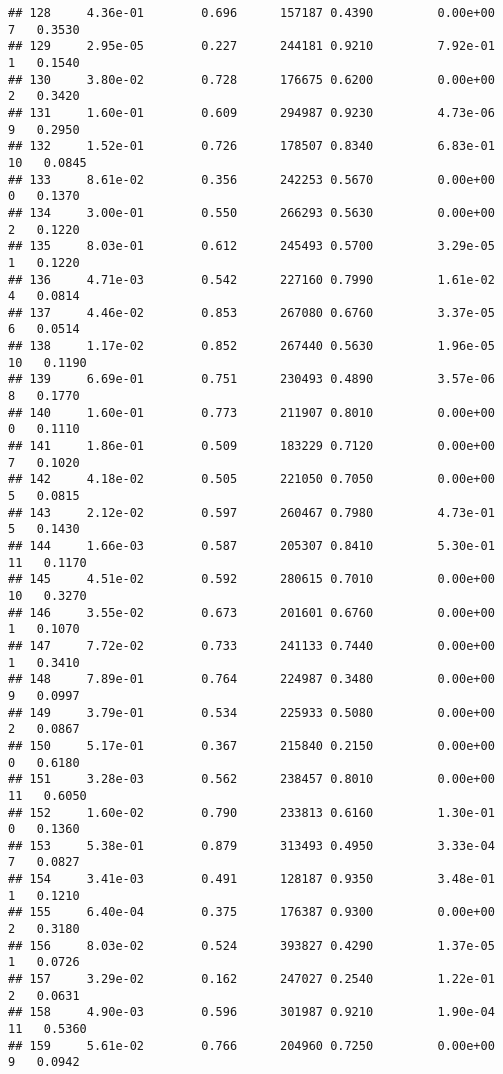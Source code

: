 \documentclass[
]{article}
\begin{document}
\begin{verbatim}
## 128     4.36e-01        0.696      157187 0.4390         0.00e+00   7   0.3530
## 129     2.95e-05        0.227      244181 0.9210         7.92e-01   1   0.1540
## 130     3.80e-02        0.728      176675 0.6200         0.00e+00   2   0.3420
## 131     1.60e-01        0.609      294987 0.9230         4.73e-06   9   0.2950
## 132     1.52e-01        0.726      178507 0.8340         6.83e-01  10   0.0845
## 133     8.61e-02        0.356      242253 0.5670         0.00e+00   0   0.1370
## 134     3.00e-01        0.550      266293 0.5630         0.00e+00   2   0.1220
## 135     8.03e-01        0.612      245493 0.5700         3.29e-05   1   0.1220
## 136     4.71e-03        0.542      227160 0.7990         1.61e-02   4   0.0814
## 137     4.46e-02        0.853      267080 0.6760         3.37e-05   6   0.0514
## 138     1.17e-02        0.852      267440 0.5630         1.96e-05  10   0.1190
## 139     6.69e-01        0.751      230493 0.4890         3.57e-06   8   0.1770
## 140     1.60e-01        0.773      211907 0.8010         0.00e+00   0   0.1110
## 141     1.86e-01        0.509      183229 0.7120         0.00e+00   7   0.1020
## 142     4.18e-02        0.505      221050 0.7050         0.00e+00   5   0.0815
## 143     2.12e-02        0.597      260467 0.7980         4.73e-01   5   0.1430
## 144     1.66e-03        0.587      205307 0.8410         5.30e-01  11   0.1170
## 145     4.51e-02        0.592      280615 0.7010         0.00e+00  10   0.3270
## 146     3.55e-02        0.673      201601 0.6760         0.00e+00   1   0.1070
## 147     7.72e-02        0.733      241133 0.7440         0.00e+00   1   0.3410
## 148     7.89e-01        0.764      224987 0.3480         0.00e+00   9   0.0997
## 149     3.79e-01        0.534      225933 0.5080         0.00e+00   2   0.0867
## 150     5.17e-01        0.367      215840 0.2150         0.00e+00   0   0.6180
## 151     3.28e-03        0.562      238457 0.8010         0.00e+00  11   0.6050
## 152     1.60e-02        0.790      233813 0.6160         1.30e-01   0   0.1360
## 153     5.38e-01        0.879      313493 0.4950         3.33e-04   7   0.0827
## 154     3.41e-03        0.491      128187 0.9350         3.48e-01   1   0.1210
## 155     6.40e-04        0.375      176387 0.9300         0.00e+00   2   0.3180
## 156     8.03e-02        0.524      393827 0.4290         1.37e-05   1   0.0726
## 157     3.29e-02        0.162      247027 0.2540         1.22e-01   2   0.0631
## 158     4.90e-03        0.596      301987 0.9210         1.90e-04  11   0.5360
## 159     5.61e-02        0.766      204960 0.7250         0.00e+00   9   0.0942

\end{verbatim}
\end{document}
